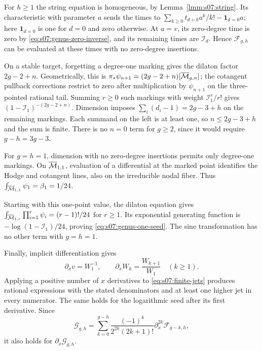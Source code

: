 \begin{prf}
For $h\geq1$ the string equation is homogeneous, by
Lemma~\ref{lmm:s07:string}. Its characteristic with parameter $a$
sends the times to
$\sum_{k\geq0}t_{d+k}a^k/k!-\mathbf1_{d=0}a$; here
$\mathbf1_{d=0}$ is one for $d=0$ and zero otherwise.
At $a=v$, its zero-degree time is zero by
\eqref{eq:s07:genus-zero-inverse}, and its remaining times are
$\mathcal I_d$. Hence $\mathcal F_{g,h}$ can be evaluated at these
times with no zero-degree insertions.

On a stable target, forgetting a degree-one marking gives the dilaton
factor $2g-2+n$. Geometrically, this is
$\pi_*\psi_{n+1}=(2g-2+n)[\overline{\mathcal{M}}_{g,n}]$; the cotangent pullback
corrections restrict to zero after multiplication by $\psi_{n+1}$
on the three-pointed rational tail. Summing $r\geq0$ such markings
with weight $\mathcal I_1^r/r!$ gives
$(1-\mathcal I_1)^{-(2g-2+n)}$. Dimension imposes
$\sum_i(d_i-1)=2g-3+h$ on the remaining markings. Each summand on
the left is at least one, so $n\leq2g-3+h$ and the sum is finite.
There is no $n=0$ term for $g\geq2$, since it would require
$g-h=3g-3$.

For $g=h=1$, dimension with no zero-degree insertions permits only
degree-one markings. On $\overline{\mathcal{M}}_{1,1}$, evaluation of a differential at
the marked point identifies the Hodge and cotangent lines, also on
the irreducible nodal fiber. Thus
$\int_{\overline{\mathcal{M}}_{1,1}}\psi_1=\beta_1=1/24$.

Starting with this one-point value, the dilaton equation gives
$\int_{\overline{\mathcal{M}}_{1,r}}\prod_{i=1}^r\psi_i=(r-1)!/24$ for $r\geq1$.
Its exponential generating function is
$-\log(1-\mathcal I_1)/24$, proving
\eqref{eq:s07:genus-one-seed}. The sine transformation has no
other term with $g=h=1$.

Finally, implicit differentiation gives
\begin{equation}\label{eq:s07:jet-x}
 \partial_xv=W_1^{-1},\qquad
 \partial_xW_k=\frac{W_{k+1}}{W_1}\quad(k\geq1).
\end{equation}
Applying a positive number of $x$ derivatives to
\eqref{eq:s07:finite-jets} produces rational expressions with the
stated denominators and at least one higher jet in every numerator.
The same holds for the logarithmic seed after its first derivative.
Since
\[
 \mathcal G_{g,h}
 =\sum_{k=0}^{g-h}\frac{(-1)^k}{2^{2k}(2k+1)!}
                           \partial_x^{2k}\mathcal F_{g-k,h},
\]
it also holds for $\partial_x\mathcal G_{g,h}$.
\end{prf}

